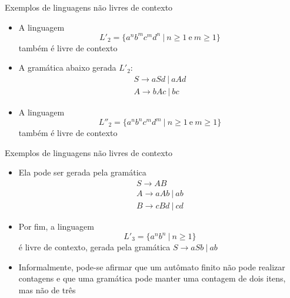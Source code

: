 \begin{frame}[fragile]{Exemplos de linguagens não livres de contexto}

    \begin{itemize}
        \item A linguagem
        \[
            L'_2 = \{ a^nb^mc^md^n\ |\ n\geq 1\ \mbox{e}\ m\geq 1\}
        \]
        também é livre de contexto
        \pause

        \item A gramática abaixo gerada $L'_2$:
        \[
            \begin{array}{l}
                S \to aSd\ |\ aAd \\
                A \to bAc\ |\ bc
            \end{array}
        \]
        \pause

        \item A linguagem
        \[
            L''_2 = \{ a^nb^nc^md^m\ |\ n\geq 1\ \mbox{e}\ m\geq 1\}
        \]
        também é livre de contexto
        \pause

        \end{itemize}

\end{frame}

\begin{frame}[fragile]{Exemplos de linguagens não livres de contexto}

    \begin{itemize}
        \item Ela pode ser gerada pela gramática
        \[
            \begin{array}{l}
                S \to AB \\
                A \to aAb\ |\ ab \\
                B \to cBd\ |\ cd
            \end{array}
        \]
        \pause

        \item Por fim, a linguagem
        \[
            L'_3 = \{ a^nb^n\ |\ n\geq 1\}
        \]
        é livre de contexto, gerada pela gramática $S\to aSb\ |\ ab$
        \pause

        \item Informalmente, pode-se afirmar que um autômato finito não pode realizar contagens e que uma gramática pode manter uma contagem de dois itens, mas
            não de três
    \end{itemize}

\end{frame}
